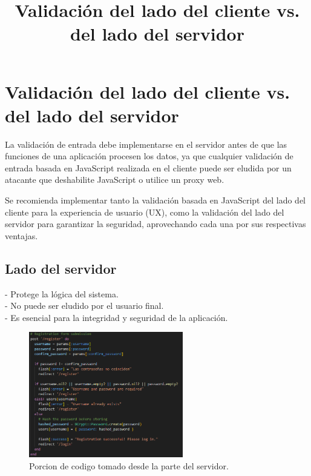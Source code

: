 \documentclass[12pt]{article}
\title{Validación del lado del cliente vs. del lado del servidor}
\date{}
\begin{document}
\maketitle

\section*{Validación del lado del cliente vs. del lado del servidor}

La validación de entrada debe implementarse en el servidor antes de que las funciones de una aplicación procesen los datos, ya que cualquier validación de entrada basada en JavaScript realizada en el cliente puede ser eludida por un atacante que deshabilite JavaScript o utilice un proxy web.

Se recomienda implementar tanto la validación basada en JavaScript del lado del cliente para la experiencia de usuario (UX), como la validación del lado del servidor para garantizar la seguridad, aprovechando cada una por sus respectivas ventajas.

\subsection*{Lado del servidor}
- Protege la lógica del sistema. \\
- No puede ser eludido por el usuario final. \\
- Es esencial para la integridad y seguridad de la aplicación.

\begin{figure}[h!]
  \centering
  \includegraphics[width=0.6\textwidth]{first.png}
  \caption{Porcion de codigo tomado desde la parte del servidor.}
  \label{fig:ejemplo}
\end{figure}
\end{document}
